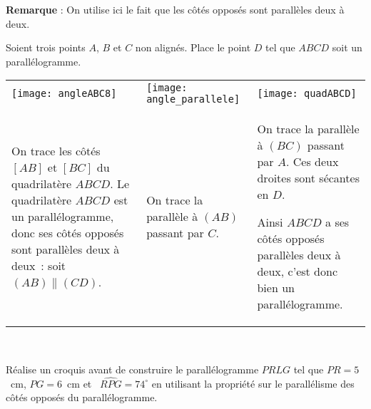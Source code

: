 \begin{methode*1}

\vspace{0.8em}
\textcolor{H1}{\textbf{Remarque}} : On utilise ici le fait que les côtés opposés sont parallèles deux à deux.

\begin{exemple*1}
Soient trois points $A$, $B$ et $C$ non alignés. Place le point $D$ tel que $ABCD$ soit un parallélogramme.\\[0.5em]


\begin{tabularx}{\textwidth}{X|X|X}
 \qquad \texttt{[image: angleABC8]} & \texttt{[image: angle\_parallele]} & \texttt{[image: quadABCD]} \\ 
 On trace les côtés $[AB]$ et $[BC]$ du quadrilatère $ABCD$. Le quadrilatère $ABCD$ est un parallélogramme, donc ses côtés opposés sont parallèles deux à deux : soit $(AB) \parallel (CD)$. & On trace la parallèle à $(AB)$ passant par $C$. & On trace la parallèle à $(BC)$ passant par $A$. Ces deux droites sont sécantes en $D$.
 
 Ainsi $ABCD$ a ses côtés opposés parallèles deux à deux, c'est donc bien un parallélogramme. \\
\end{tabularx} \\[1em]

\end{exemple*1}

\exercice
Réalise un croquis avant de construire le parallélogramme $PRLG$ tel que $PR = 5$ cm, $PG = 6$ cm et  $\widehat{RPG} = 74^\circ$ en utilisant la propriété sur le parallélisme des côtés opposés du parallélogramme.

\end{methode*1}

\newpage





